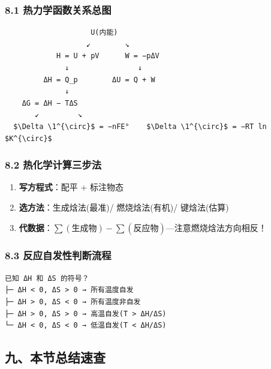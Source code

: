 \subsubsection{8.1 热力学函数关系总图}\label{ux70edux529bux5b66ux51fdux6570ux5173ux7cfbux603bux56fe}

\begin{verbatim}
                    U(内能)
                   ↙        ↘
            H = U + pV      W = −pΔV
              ↓                ↓
         ΔH = Q_p        ΔU = Q + W
              ↓
    ΔG = ΔH − TΔS
       ↙         ↘
  $\Delta \1^{\circ}$ = −nFE°    $\Delta \1^{\circ}$ = −RT ln $K^{\circ}$
\end{verbatim}

\subsubsection{8.2 热化学计算三步法}\label{ux70edux5316ux5b66ux8ba1ux7b97ux4e09ux6b65ux6cd5}

\begin{enumerate}
\def\labelenumi{\arabic{enumi}.}
\tightlist
\item
  \textbf{写方程式}：配平 + 标注物态
\item
  \textbf{选方法}：生成焓法(最准)/ 燃烧焓法(有机)/ 键焓法(估算)
\item
  \textbf{代数据}：\(\sum(\text{生成物}) - \sum(\text{反应物})\)---注意燃烧焓法方向相反！
\end{enumerate}

\subsubsection{8.3 反应自发性判断流程}\label{ux53cdux5e94ux81eaux53d1ux6027ux5224ux65adux6d41ux7a0b}

\begin{verbatim}
已知 ΔH 和 ΔS 的符号？
├─ ΔH < 0, ΔS > 0 → 所有温度自发
├─ ΔH > 0, ΔS < 0 → 所有温度非自发
├─ ΔH > 0, ΔS > 0 → 高温自发(T > ΔH/ΔS)
└─ ΔH < 0, ΔS < 0 → 低温自发(T < ΔH/ΔS)
\end{verbatim}

\subsection{九、本节总结速查}\label{ux4e5dux672cux8282ux603bux7ed3ux901fux67e5}


